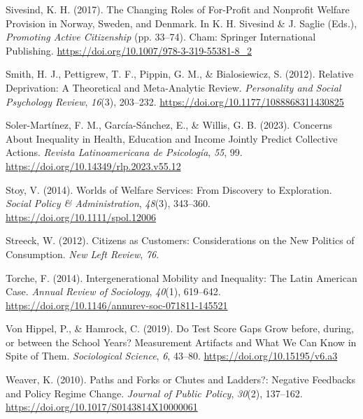 \documentclass[
  letterpaper,
  DIV=11,
  numbers=noendperiod]{scrartcl}
\newlength{\cslhangindent}
\newlength{\cslentryspacingunit} %
\newenvironment{CSLReferences}[2] %
 {%
  \setlength{\parindent}{0pt}
  \ifodd #1
  \let\oldpar\par
  \def\par{\hangindent=\cslhangindent\oldpar}
  \fi
  \setlength{\parskip}{#2\cslentryspacingunit}
 }%
 {}
\begin{document}
\begin{CSLReferences}{1}{0}
\leavevmode{}%
Sivesind, K. H. (2017). The {Changing Roles} of {For-Profit} and
{Nonprofit Welfare Provision} in {Norway}, {Sweden}, and {Denmark}. In
K. H. Sivesind \& J. Saglie (Eds.), \emph{Promoting {Active
Citizenship}} (pp. 33--74). Cham: Springer International Publishing.
\url{https://doi.org/10.1007/978-3-319-55381-8_2}

\leavevmode{}%
Smith, H. J., Pettigrew, T. F., Pippin, G. M., \& Bialosiewicz, S.
(2012). Relative {Deprivation}: {A Theoretical} and {Meta-Analytic
Review}. \emph{Personality and Social Psychology Review}, \emph{16}(3),
203--232. \url{https://doi.org/10.1177/1088868311430825}

\leavevmode{}%
Soler-Martínez, F. M., García-Sánchez, E., \& Willis, G. B. (2023).
Concerns {About Inequality} in {Health}, {Education} and {Income Jointly
Predict Collective Actions}. \emph{Revista Latinoamericana de
Psicolog{í}a}, \emph{55}, 99.
\url{https://doi.org/10.14349/rlp.2023.v55.12}

\leavevmode{}%
Stoy, V. (2014). Worlds of {Welfare Services}: {From Discovery} to
{Exploration}. \emph{Social Policy \& Administration}, \emph{48}(3),
343--360. \url{https://doi.org/10.1111/spol.12006}

\leavevmode{}%
Streeck, W. (2012). Citizens as {Customers}: {Considerations} on the
{New Politics} of {Consumption}. \emph{New Left Review}, \emph{76}.

\leavevmode{}%
Torche, F. (2014). Intergenerational {Mobility} and {Inequality}: {The
Latin American Case}. \emph{Annual Review of Sociology}, \emph{40}(1),
619--642. \url{https://doi.org/10.1146/annurev-soc-071811-145521}

\leavevmode{}%
Von Hippel, P., \& Hamrock, C. (2019). Do {Test Score Gaps Grow} before,
during, or between the {School Years}? {Measurement Artifacts} and {What
We Can Know} in {Spite} of {Them}. \emph{Sociological Science},
\emph{6}, 43--80. \url{https://doi.org/10.15195/v6.a3}

\leavevmode{}%
Weaver, K. (2010). Paths and {Forks} or {Chutes} and {Ladders}?:
{Negative Feedbacks} and {Policy Regime Change}. \emph{Journal of Public
Policy}, \emph{30}(2), 137--162.
\url{https://doi.org/10.1017/S0143814X10000061}


\end{CSLReferences}
\end{document}

